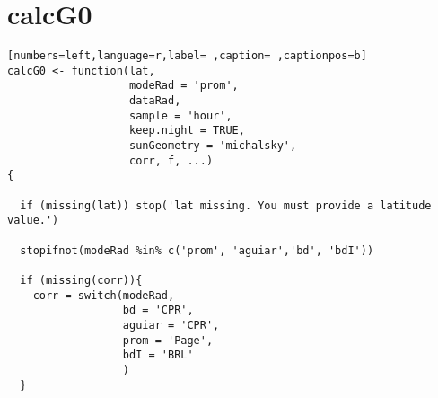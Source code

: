 \section{calcG0}
\label{sec:org9b55144}
\begin{lstlisting}[numbers=left,language=r,label= ,caption= ,captionpos=b]
calcG0 <- function(lat,
                   modeRad = 'prom',
                   dataRad,
                   sample = 'hour',
                   keep.night = TRUE,
                   sunGeometry = 'michalsky',
                   corr, f, ...)
{
  
  if (missing(lat)) stop('lat missing. You must provide a latitude value.')
  
  stopifnot(modeRad %in% c('prom', 'aguiar','bd', 'bdI'))
  
  if (missing(corr)){
    corr = switch(modeRad,
                  bd = 'CPR', 
                  aguiar = 'CPR', 
                  prom = 'Page',  
                  bdI = 'BRL'     
                  )
  }
  

\end{lstlisting}

